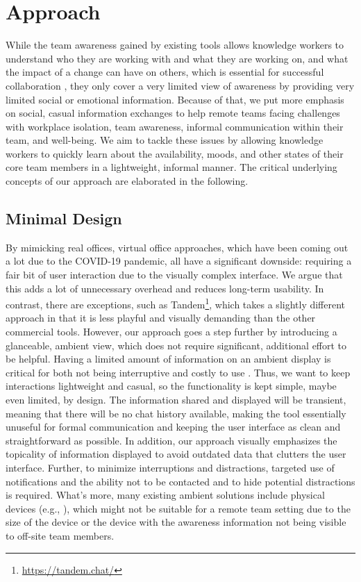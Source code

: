 \chapter{Approach}
\label{chapter:approach}
While the team awareness gained by existing tools allows knowledge workers to understand who they are working with and what they are working on, and what the impact of a change can have on others, which is essential for successful collaboration \autocite{dourish1992awareness}, they only cover a very limited view of awareness by providing very limited social or emotional information. Because of that, we put more emphasis on social, casual information exchanges to help remote teams facing challenges with workplace isolation, team awareness, informal communication within their team, and well-being. We aim to tackle these issues by allowing knowledge workers to quickly learn about the availability, moods, and other states of their core team members in a lightweight, informal manner. The critical underlying concepts of our approach are elaborated in the following.

\section{Minimal Design}
By mimicking real offices, virtual office approaches, which have been coming out a lot due to the COVID-19 pandemic, all have a significant downside: requiring a fair bit of user interaction due to the visually complex interface. We argue that this adds a lot of unnecessary overhead and reduces long-term usability. In contrast, there are exceptions, such as Tandem\footnote{\url{https://tandem.chat/}}, which takes a slightly different approach in that it is less playful and visually demanding than the other commercial tools. However, our approach goes a step further by introducing a glanceable, ambient view, which does not require significant, additional effort to be helpful. Having a limited amount of information on an ambient display is critical for both not being interruptive and costly to use \autocite{dabbish2004controlling}. Thus, we want to keep interactions lightweight and casual, so the functionality is kept simple, maybe even limited, by design. The information shared and displayed will be transient, meaning that there will be no chat history available, making the tool essentially unuseful for formal communication and keeping the user interface as clean and straightforward as possible. In addition, our approach visually emphasizes the topicality of information displayed to avoid outdated data that clutters the user interface. Further, to minimize interruptions and distractions, targeted use of notifications and the ability not to be contacted and to hide potential distractions is required. What's more, many existing ambient solutions include physical devices (e.g., \autocite{ downs2012ambient, alavi2012ambient, rocker2004using}), which might not be suitable for a remote team setting due to the size of the device or the device with the awareness information not being visible to off-site team members.

